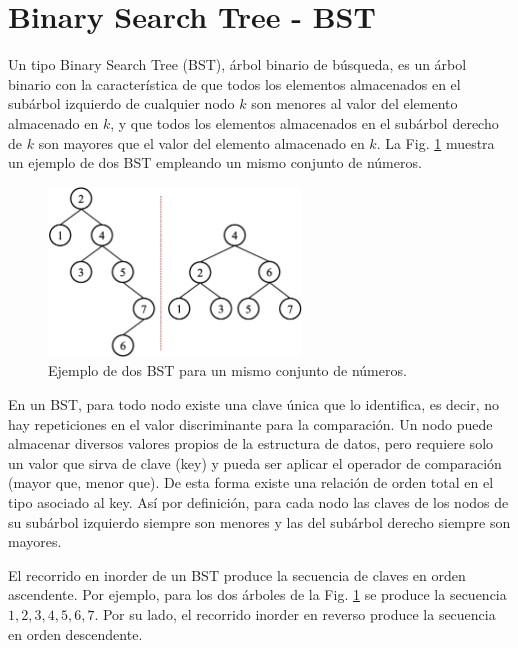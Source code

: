 \section{Binary Search Tree - BST}

Un tipo Binary Search Tree (BST), árbol binario de búsqueda, es un árbol binario con la característica de que todos los elementos almacenados en el subárbol izquierdo de cualquier nodo $k$ son menores al valor del elemento almacenado en $k$, y que todos los elementos almacenados en el subárbol derecho de $k$ son mayores que el valor del elemento almacenado en $k$. La Fig. \ref{fig:BSTExample1} muestra un ejemplo de dos BST empleando un mismo conjunto de números.

\begin{figure}[htpb!]
  \begin{center}
    \includegraphics[width=0.6\textwidth]{images/BSTExample1.eps}
  \end{center}
  \caption{Ejemplo de dos BST para un mismo conjunto de números.}
  \label{fig:BSTExample1}
\end{figure}

En un BST, para todo nodo existe una clave única que lo identifica, es decir, no hay repeticiones en el valor discriminante para la comparación. Un nodo puede almacenar diversos valores propios de la estructura de datos, pero requiere solo un valor que sirva de clave (key) y pueda ser aplicar el operador de comparación (mayor que, menor que). De esta forma existe una relación de orden total en el tipo asociado al key. Así por definición, para cada nodo las claves de los nodos de su subárbol izquierdo siempre son menores y las del subárbol derecho siempre son mayores.

El recorrido en inorder de un BST produce la secuencia de claves en orden ascendente. Por ejemplo, para los dos árboles de la Fig. \ref{fig:BSTExample1} se produce la secuencia $1, 2, 3, 4, 5, 6, 7$. Por su lado, el recorrido inorder en reverso produce la secuencia en orden descendente.

